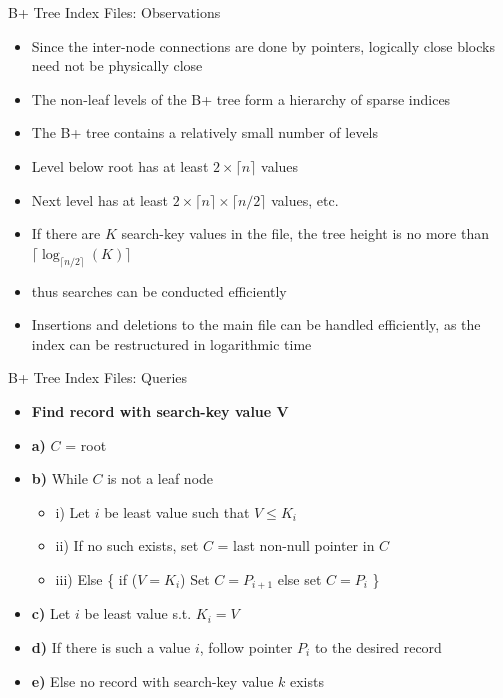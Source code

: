 \documentclass[aspectratio=169, xcolor=dvipsnames]{beamer}
\begin{document}
\begin{frame}{B+ Tree Index Files: Observations}
    \begin{itemize}[<+->]
        \item Since the inter-node connections are done by pointers, logically close blocks need not be physically close
        \item The non-leaf levels of the B+ tree form a hierarchy of sparse indices
        \item The B+ tree contains a relatively small number of levels
        \item Level below root has at least $2 \times \lceil n \rceil$ values
        \item Next level has at least $2 \times \lceil n \rceil \times \lceil n/2 \rceil$ values, etc.
        \item If there are $K$ search-key values in the file, the tree height is no more than $\lceil \log_{\lceil n/2 \rceil} (K) \rceil$
        \item thus searches can be conducted efficiently
        \item Insertions and deletions to the main file can be handled efficiently, as the index can be restructured in logarithmic time
    \end{itemize}
\end{frame}

\begin{frame}{B+ Tree Index Files: Queries}
    \begin{itemize}[<+->]
        \item \textbf{Find record with search-key value V}
        \item \textbf{a)} $C$ = root
        \item \textbf{b)} While $C$ is not a leaf node
        \begin{itemize}
            \item i) Let $i$ be least value such that $V \le K_i$
            \item ii) If no such exists, set $C$ = last non-null pointer in $C$
            \item iii) Else \{ if ($V = K_i$) Set $C = P_{i+1}$ else set $C = P_i$ \}
        \end{itemize}
        \item \textbf{c)} Let $i$ be least value s.t. $K_i = V$
        \item \textbf{d)} If there is such a value $i$, follow pointer $P_i$ to the desired record
        \item \textbf{e)} Else no record with search-key value $k$ exists
    \end{itemize}
\end{frame}
\end{document}
